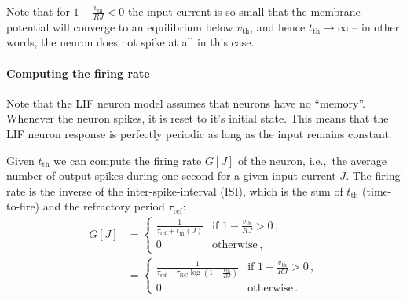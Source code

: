 \documentclass[10pt,letterpaper,oneside]{article}
\begin{document}

Note that for $1 - \frac{v_\mathrm{th}}{RJ} < 0$ the input current is so small that the membrane potential will converge to an equilibrium below $v_\mathrm{th}$, and hence $t_\mathrm{th} \to \infty$ -- in other words, the neuron does not spike at all in this case.

\paragraph{Computing the firing rate}

Note that the LIF neuron model assumes that neurons have no \enquote{memory}. Whenever the neuron spikes, it is reset to it's initial state. This means that the LIF neuron response is perfectly periodic as long as the input remains constant.


Given $t_\mathrm{th}$ we can compute the firing rate $G[J]$ of the neuron, i.e.,~the average number of output spikes during one second for a given input current $J$. The firing rate is the inverse of the inter-spike-interval (ISI), which is the sum of $t_\mathrm{th}$ (time-to-fire) and the refractory period $\tau_\mathrm{ref}$:
\begin{align*}
	G[J]
		&= \begin{cases}
			\frac{1}{\tau_\mathrm{ref} + t_\mathrm{th}(J)} & \text{if } 1 - \frac{v_\mathrm{th}}{RJ} > 0 \,,\\
			0 & \mathrm{otherwise} \,,
		\end{cases} \\
		&= \begin{cases}
			\frac{1}{\tau_\mathrm{ref} - \tau_\mathrm{RC} \log \left( 1 - \frac{v_\mathrm{th}}{RJ} \right)} & \text{if } 1 - \frac{v_\mathrm{th}}{RJ} > 0 \,,\\
			0 & \mathrm{otherwise} \,.
		\end{cases}
\end{align*}
\end{document}
